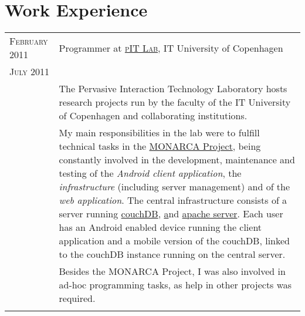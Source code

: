 \documentclass[a4paper,10pt]{article}
\begin{document}
\section{Work Experience}
\begin{tabular}{p{2.5cm}|p{11cm}}

 \raggedleft \textsc{February 2011} & Programmer at
 \textsc{\href{http://www.itu.dk/pit/}{pIT Lab}}, IT University of Copenhagen
 \\\raggedleft \textsc{July 2011}\\& 
 \footnotesize{The Pervasive Interaction Technology Laboratory hosts research
 projects run by the faculty of the IT University of Copenhagen and
 collaborating institutions.}\\

 & \footnotesize{My main responsibilities in the lab were to fulfill technical
 tasks in the \href{http://www.monarca-project.eu/}{MONARCA Project}, being constantly involved in the  development, maintenance and testing of the \emph{Android client application}, the \emph{infrastructure} (including server management) and of the \emph{web application}. The central infrastructure consists of a server running \href{http://couchdb.apache.org}{couchDB}, \href{http://www.joomla.org} and \href{http://httpd.apache.org}{apache server}. Each user has an Android enabled device running the client application and a mobile version of the couchDB, linked to the couchDB instance running on the central server.}\\

& \footnotesize{Besides the MONARCA Project, I was also involved in ad-hoc programming tasks, as help in other projects was required.}\\\\


\end{tabular}
\end{document}
